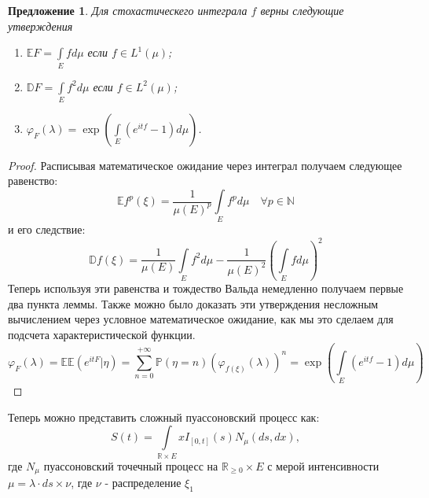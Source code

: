\documentclass[12pt,a4paper]{article} %
\newtheorem{proposition}{Предложение}
\newcommand{\R}{\mathbb{R}}
\newcommand{\E}{\mathbb{E}}
\newcommand{\D}{\mathbb{D}}
\newcommand{\PR}{\mathbb{P}}
\newcommand{\charf}[2][\lambda]{\varphi_{#2}(#1)}
\begin{document}
	\begin{proposition}
		\label{prop1}
		Для стохастическего интеграла $f$ верны следующие утверждения
		\begin{enumerate}
			\item $\E F= \displaystyle\int\limits_Efd\mu$ если $f\in L^1 (\mu)$;
			\item $\D F= \displaystyle\int\limits_Ef^2d\mu$ если $f\in L^2 (\mu)$;
			\item $\charf{F}=\exp\left(\displaystyle\int\limits_E(e^{itf}-1)d\mu\right)$.
		\end{enumerate}
	\end{proposition}
	\begin{proof}
		Расписывая математическое ожидание через интеграл получаем следующее равенство:
		\begin{equation*}
			\E f^p(\xi)=\frac{1}{\mu (E)^p}\displaystyle\int\limits_Ef^pd\mu \quad \forall p\in \mathbb{N}
		\end{equation*}
		и его следствие:
		\begin{equation*}
			\D f(\xi)=\frac{1}{\mu (E)}\displaystyle\int\limits_Ef^2d\mu - \frac{1}{\mu (E)^2}\left(\displaystyle\int\limits_Efd\mu\right)^2
		\end{equation*}
		Теперь используя эти равенства и тождество Вальда немедленно получаем первые два пункта леммы.
		Также можно было доказать эти утверждения несложным вычислением через условное математическое ожидание, как мы это сделаем для подсчета характеристической функции.
		$$\charf{F}=\E\E (e^{itF}\vert \eta)=\sum_{n=0}^{+\infty}\PR (\eta =n)(\charf{f(\xi)})^n =\exp\left(\displaystyle\int\limits_E(e^{itf}-1)d\mu\right)$$
	\end{proof}
	Теперь можно представить сложный пуассоновский процесс как:
	$$S(t)=\int\limits_{\R\times E}xI_{[0,t]}(s)N_{\mu}(ds,dx),$$
	где $N_{\mu}$ пуассоновский точечный процесс на $\R_{\geq0}\times E$ с мерой интенсивности $\mu=\lambda\cdot ds\times\nu$, где $\nu$ - распределение $\xi_1$
\end{document}
